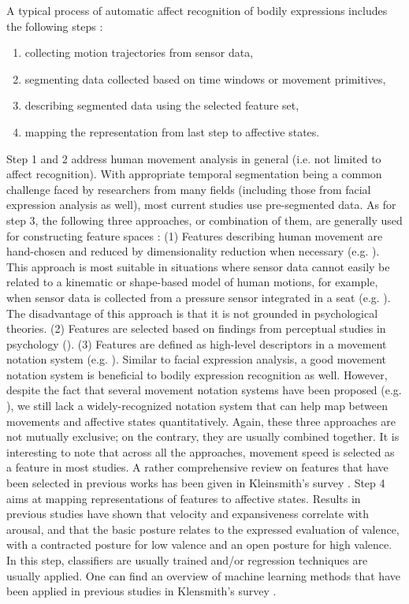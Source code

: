 A typical process of automatic affect recognition of bodily expressions includes the following steps \cite{karg2013body}:
\begin{enumerate}
\item collecting motion trajectories from sensor data,
\item segmenting data collected based on time windows or movement primitives,
\item describing segmented data using the selected feature set,
\item mapping the representation from last step to affective states.
\end{enumerate}
Step 1 and 2 address human movement analysis in general (i.e. not limited to affect recognition). With appropriate temporal segmentation being a common challenge faced by researchers from many fields (including those from facial expression analysis as well), most current studies use pre-segmented data. As for step 3, the following three approaches, or combination of them, are generally used for constructing feature spaces \cite{karg2013body}: (1) Features describing human movement are hand-chosen and reduced by dimensionality reduction when necessary (e.g. \cite{nicolaou2011continuous}). This approach is most suitable in situations where sensor data cannot easily be related to a kinematic or shape-based model of human motions, for example, when sensor data is collected from a pressure sensor integrated in a seat (e.g. \cite{d2009automatic}). The disadvantage of this approach is that it is not grounded in psychological theories. (2) Features are selected based on findings from perceptual studies in psychology (\cite{karg2010recognition}). (3) Features are defined as high-level descriptors in a movement notation system (e.g. \cite{castellano2007recognising}). Similar to facial expression analysis, a good movement notation system is beneficial to bodily expression recognition as well. However, despite the fact that several movement notation systems have been proposed (e.g. \cite{birdwhistell2011kinesics}), we still lack a widely-recognized notation system that can help map between movements and affective states quantitatively. Again, these three approaches are not mutually exclusive; on the contrary, they are usually combined together. It is interesting to note that across all the approaches, movement speed is selected as a feature in most studies. A rather comprehensive review on features that have been selected in previous works has been given in Kleinsmith's survey \cite{kleinsmith2013affective}. 
Step 4 aims at mapping representations of features to affective states. Results in previous studies \cite{beck2010interpretation} have shown that velocity and expansiveness correlate with arousal, and that the basic posture relates to the expressed evaluation of valence, with a contracted posture for low valence and an open posture for high valence. In this step, classifiers are usually trained and/or regression techniques are usually applied. One can find an overview of machine learning methods that have been applied in previous studies in Klensmith's survey \cite{kleinsmith2013affective}.

